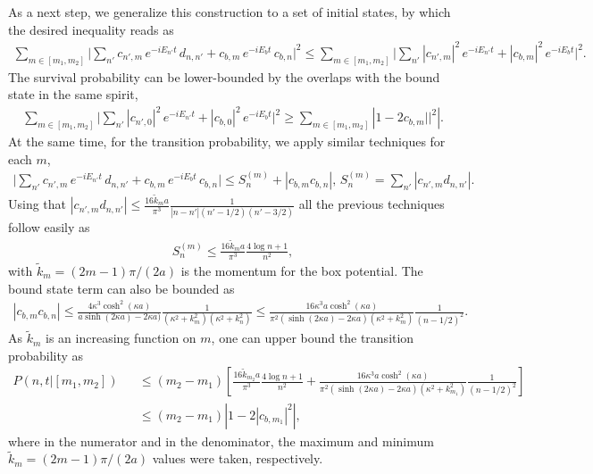 \documentclass[prl,aps,amssymb,twocolumn,superscriptaddress, notitlepage, longbibliography]{revtex4-2}
\begin{document}
As a next step, we generalize this construction to a set of initial states, by which the desired inequality reads as
\begin{eqnarray}
    \sum_{m\in[m_1,m_2]}\Bigg|
\sum_{n'} c_{n',m} \, e^{-i E_{n'} t} \, d_{n,n'} + c_{b,m} \, e^{-i E_b t} \, c_{b,n}
\Bigg|^2\leq\sum_{m\in[m_1,m_2]}\Bigg| \sum_{n'} |c_{n',m}|^2 \, e^{-i E_{n'} t} + |c_{b,m}|^2 \, e^{-i E_b t} \Bigg|^2.
\end{eqnarray}
The survival probability can be lower-bounded by the overlaps with the bound state in the same spirit,
\begin{eqnarray}
    \sum_{m\in[m_1,m_2]}\Bigg| \sum_{n'} |c_{n',0}|^2 \, e^{-i E_{n'} t} + |c_{b,0}|^2 \, e^{-i E_b t} \Bigg|^2\geq\sum_{m\in[m_1,m_2]}\left|1-2c_{b,m}||^2\right|.
\end{eqnarray}
At the same time, for the transition probability, we apply similar techniques for each $m$,
\begin{eqnarray}
    \Bigg|
\sum_{n'} c_{n',m} \, e^{-i E_{n'} t} \, d_{n,n'} + c_{b,m} \, e^{-i E_b t} \, c_{b,n}
\Bigg|\leq S^{(m)}_n+|c_{b,m}c_{b,n}|,\,S^{(m)}_n=\sum_{n'}|c_{n',m}d_{n,n'}|.
\end{eqnarray}
Using that $|c_{n',m}d_{n,n'}|\leq\frac{16\tilde k_ma}{\pi^3}\frac{1}{|n-n'|(n'-1/2)(n'-3/2)}$ all the previous techniques follow easily as
\begin{eqnarray}
    S^{(m)}_n\leq\frac{16\tilde k_ma}{\pi^3}\frac{4\log n+1}{n^2},
\end{eqnarray}
with $\tilde k_m=(2m-1)\pi/(2a)$ is the momentum for the box potential.
The bound state term can also be bounded as
\begin{eqnarray}
    |c_{b,m}c_{b,n}|\leq\frac{4\kappa^3\cosh^2(\kappa a)}{a\sinh(2\kappa a)-2\kappa a)}\frac{1}{(\kappa^2+k^2_m)(\kappa^2+k^2_n)}\leq\frac{16\kappa^3a\cosh^2(\kappa a)}{\pi^2(\sinh(2\kappa a)-2\kappa a)(\kappa^2+k^2_{m})}\frac{1}{(n-1/2)^2}.
\end{eqnarray}
As $\tilde k_m$ is an increasing function on $m$, one can upper bound the transition probability as
\begin{eqnarray}
    P(n,t|[m_1,m_2])&&\leq(m_2-m_1)\left[\frac{16\tilde k_{m_2}a}{\pi^3}\frac{4\log n+1}{n^2}+\frac{16\kappa^3a\cosh^2(\kappa a)}{\pi^2(\sinh(2\kappa a)-2\kappa a)(\kappa^2+k^2_{m_1})}\frac{1}{(n-1/2)^2}\right]\nonumber\\
    &&\leq (m_2-m_1)\left|1-2|c_{b,m_1}|^2\right|,
\end{eqnarray}
where in the numerator and in the denominator, the maximum and minimum $\tilde k_m=(2m-1)\pi/(2a)$ values were taken, respectively.
\end{document}
